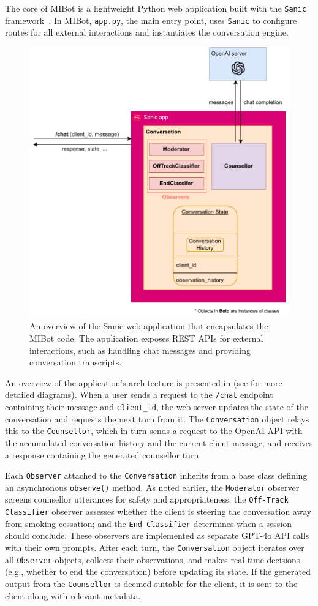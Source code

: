 The core of MIBot is a lightweight Python web application built with the \texttt{Sanic} framework~\citep{pi_sanic}. In MIBot, \texttt{app.py}, the main entry point, uses \texttt{Sanic} to configure routes for all external interactions and instantiates the conversation engine.
\begin{figure}[ht]
  \centering
  \includegraphics[width=0.7\linewidth]{fig/microservice.drawio.pdf} 
  \caption[MIBot Sanic Application Overview]{An overview of the Sanic web application that encapsulates the MIBot code. The application exposes REST APIs for external interactions, such as handling chat messages and providing conversation transcripts.}
  \label{fig:microservice}
\end{figure}
An overview of the application's architecture is presented in  (see  for more detailed diagrams). When a user sends a request to the \texttt{/chat} endpoint containing their message and \texttt{client\_id}, the web server updates the state of the conversation and requests the next turn from it. The \texttt{Conversation} object relays this to the \texttt{Counsellor}, which in turn sends a request to the OpenAI API with the accumulated conversation history and the current client message, and receives a response containing the generated counsellor turn.

Each \texttt{Observer} attached to the \texttt{Conversation} inherits from a base class defining an asynchronous \texttt{observe()} method. As noted earlier, the \texttt{Moderator} observer screens counsellor utterances for safety and appropriateness; the \texttt{Off-Track Classifier} observer assesses whether the client is steering the conversation away from smoking cessation; and the \texttt{End Classifier} determines when a session should conclude. These observers are implemented as separate GPT-4o API calls with their own prompts. After each turn, the \texttt{Conversation} object iterates over all \texttt{Observer} objects, collects their observations, and makes real-time decisions (e.g., whether to end the conversation) before updating its state. If the generated output from the \texttt{Counsellor} is deemed suitable for the client, it is sent to the client along with relevant metadata.

